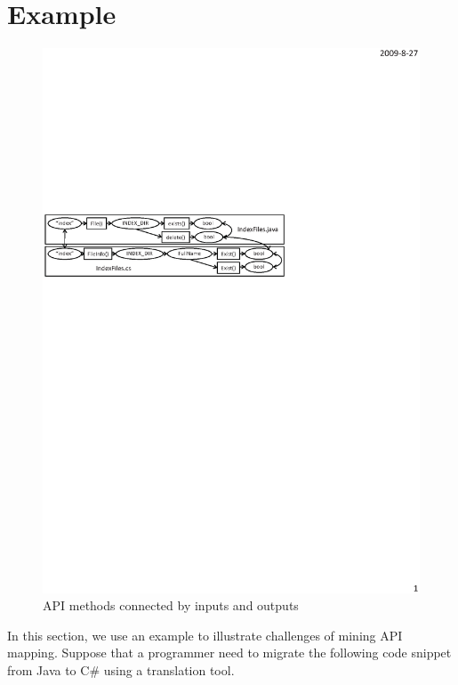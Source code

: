 \section{Example}
\label{sec:example}

\begin{figure}[t]
\centering
\includegraphics[scale=0.8,clip]{figure/dataflow.eps}\vspace*{-3ex}
 \caption
{\label{fig:dataflow}API methods connected by inputs and
outputs}\vspace*{-3ex}
\end{figure}

In this section, we use an example to illustrate challenges of
mining API mapping. Suppose that a programmer need to migrate the
following code snippet from Java to C\# using a translation tool.

